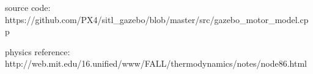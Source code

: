 \documentclass[12pt]{article}
\begin{document}
\maketitle

source code: https://github.com/PX4/sitl_gazebo/blob/master/src/gazebo_motor_model.cpp

physics reference: http://web.mit.edu/16.unified/www/FALL/thermodynamics/notes/node86.html
\end{document}
